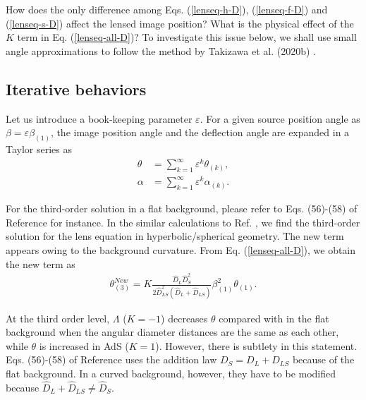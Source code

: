 \documentclass[twocolumn,showpacs,preprintnumbers,amsmath,amssymb]{revtex4-1}
\begin{document}
How does the only difference among 
Eqs. (\ref{lenseq-h-D}), (\ref{lenseq-f-D}) and (\ref{lenseq-s-D})
affect the lensed image position? 
What is the physical effect of the $K$ term in Eq. (\ref{lenseq-all-D})? 
To investigate this issue below, we shall use small angle approximations 
to follow the method by Takizawa et al. (2020b)  \cite{Takizawa2020b}. 


\subsection{Iterative behaviors}
Let us introduce a book-keeping parameter $\varepsilon$. 
For a given source position angle as $\beta = \varepsilon\beta_{(1)}$, 
the image position angle and the deflection angle are expanded 
in a Taylor series as 
\begin{align}
\theta 
&= \sum_{k=1}^{\infty} \varepsilon^k \theta_{(k)} , 
\label{theta-exp}
\\
\alpha
&= \sum_{k=1}^{\infty} \varepsilon^k \alpha_{(k)} . 
\label{alpha-exp}
\end{align}

For the third-order solution in a flat background, 
please refer to Eqs. (56)-(58) of Reference \cite{Takizawa2020b} 
for instance. 
In the similar calculations to Ref. \cite{Takizawa2020b}, 
we find the third-order solution for the lens equation 
in hyperbolic/spherical geometry. 
The new term appears owing to the background curvature. 
From Eq. (\ref{lenseq-all-D}), 
we obtain the new term as 
\begin{align}
\theta_{(3)}^{New} = 
K 
\frac{\hat{D}_L\hat{D}_S^2 }{2 \hat{D}_{LS}^2 (\hat{D}_L + \hat{D}_{LS})} 
\beta_{(1)}^2 \theta_{(1)} .
\label{theta-new} 
\end{align}

At the third order level, 
$\Lambda$ ($K = -1$) decreases $\theta$ compared with in the flat background 
when the angular diameter distances are the same as each other, 
while $\theta$ is increased in AdS ($K = 1$). 
However, there is subtlety in this statement. 
Eqs. (56)-(58) of Reference \cite{Takizawa2020b} uses 
the addition law 
$D_S = D_L + D_{LS}$ because of the flat background. 
In a curved background, however, they have to be modified 
because $\hat{D}_L + \hat{D}_{LS} \neq \hat{D}_S$. 
\end{document}
